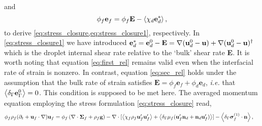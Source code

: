 and
\begin{equation}
\phi _f\textbf{e}_f
    = 
    \phi_f \textbf{E}
    - \avg{\chi_d \textbf{e}_d^*},
    \label{eq:sec_rel}
\end{equation}
to derive \ref{eq:stress_closure,eq:stress_closure1}, respectively. 
In \ref{eq:stress_closure1} we have introduced $\textbf{e}_d^* = \textbf{e}_d^0 - \textbf{E} = \mathbf{\nabla} (\textbf{u}_d^0-\textbf{u})+\mathbf{\nabla} (\textbf{u}_d^0-\textbf{u})^\dagger$ which is the droplet internal shear rate relative to the `bulk' shear rate \textbf{E}.
It is worth noting that equation \ref{eq:first_rel} remains valid even when the interfacial rate of strain is nonzero. 
In contrast, equation \ref{eq:sec_rel} holds under the assumption that the bulk rate of strain satisfies $\textbf{E} = \phi_f \textbf{e}_f + \phi_d \textbf{e}_d$, \textit{i.e.} that $\left<\delta_\Gamma \textbf{e}_\Gamma^0\right> = 0$. 
This condition is supposed to be met here.
The averaged momentum equation  employing the stress formulation \ref{eq:stress_closure} read, 
\begin{align}
    \phi_f \rho_f(\pddt + \textbf{u}_f  \cdot \grad) \textbf{u}_f
    &= \phi_f 
    \left(\div \bm{\Sigma}_f
    + \rho_f \textbf{g}\right)
    - \div 
    [\avg{\chi_f\rho_f \textbf{u}_f'\textbf{u}_f'}
    +\avg{\delta_\Gamma \mu_f( \textbf{u}_f'  \textbf{n}_d +  \textbf{n}_d \textbf{u}_f')}]
    - \avg{\delta_\Gamma \bm\sigma_f^{(1)}\cdot \textbf{n}},
    \label{eq:two_fluid_momentum}
\end{align}
